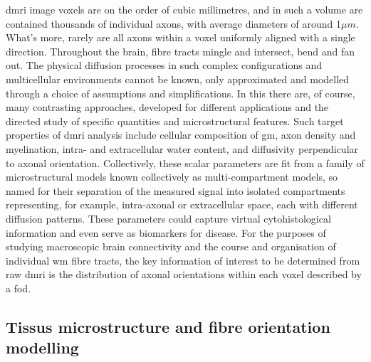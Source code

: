 \gls{dmri} image \glspl{voxel} are on the order of cubic millimetres, and in such a volume are contained thousands of individual axons, with average diameters of around 1$\mu m$\autocite{Liewald2014,Lampinen2019}.
What's more, rarely are all axons within a voxel uniformly aligned with a single direction.
Throughout the brain, fibre tracts mingle and intersect, bend and fan out.\autocite{Jeurissen2013,Alexander2019}
The physical diffusion processes in such complex configurations and multicellular environments cannot be known, only approximated and modelled through a choice of assumptions and simplifications.
In this there are, of course, many contrasting approaches, developed for different applications and the directed study of specific quantities and microstructural features.
Such target properties of \gls{dmri} analysis include cellular composition of \gls{gm}, axon density and myelination, intra- and extracellular water content, and diffusivity perpendicular to axonal orientation.
Collectively, these scalar parameters are fit from a family of microstructural models known collectively as multi-compartment models, so named for their separation of the measured signal into isolated compartments representing, for example, intra-axonal or extracellular space, each with different diffusion patterns.\autocite{Panagiotaki2012,Alexander2019}
These parameters could capture virtual cytohistological information and even serve as biomarkers for disease\autocite{Alexander2008}.
For the purposes of studying macroscopic brain connectivity and the course and organisation of individual \gls{wm} fibre tracts, the key information of interest to be determined from raw \gls{dmri} is the distribution of axonal orientations within each voxel described by a \gls{fod}.

\subsection{Tissus microstructure  and fibre orientation modelling}

